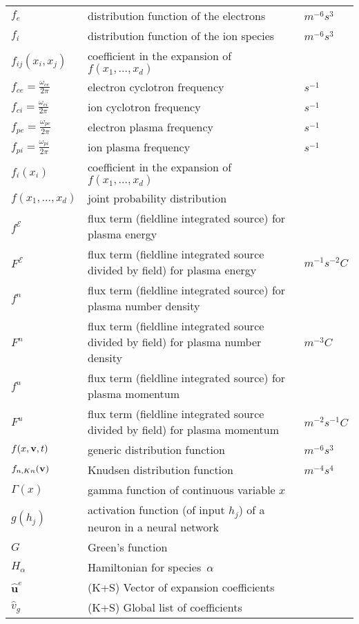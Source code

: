 \begin{longtable}{|p{3.0cm}|p{10.0cm}|p{3.0cm}|}
$f_e$ & distribution function of the electrons & $m^{-6} s^3$ \\
$f_i$ & distribution function of the ion species & $m^{-6} s^3$ \\
$f_{ij}(x_i,x_j)$ & coefficient in the expansion of $f\left(x_1,\ldots,x_d\right)$  & \\
$f_{ce}= \frac{\omega_{ce}}{2\pi}$ & electron cyclotron frequency & $s^{-1}$ \\
$f_{ci}= \frac{\omega_{ci}}{2\pi}$ & ion cyclotron frequency & $s^{-1}$ \\
$f_{pe}= \frac{\omega_{pe}}{2\pi}$ & electron plasma frequency & $s^{-1}$ \\
$f_{pi}= \frac{\omega_{pi}}{2\pi}$ & ion plasma frequency & $s^{-1}$ \\
$f_i(x_i)$ & coefficient in the expansion of $f\left(x_1,\ldots,x_d\right)$  & \\
$f\left(x_1,\ldots,x_d\right)$ & joint probability distribution  & \\
$f^\mathcal{E}$ & flux term (fieldline integrated source) for plasma energy  & \\
$F^\mathcal{E}$ & flux term (fieldline integrated source divided by field) for plasma energy  &  $m^{-1} s^{-2} C$ \\
$f^n$ & flux term (fieldline integrated source) for plasma number density & \\
$F^n$ & flux term (fieldline integrated source divided by field) for plasma number density  &  $m^{-3} C$ \\
$f^u$ & flux term (fieldline integrated source) for plasma momentum  & \\
$F^u$ & flux term (fieldline integrated source divided by field) for plasma momentum  &  $m^{-2} s^{-1} C$ \\
$f(x,{\bf v},t)$ & generic distribution function & $m^{-6} s^3$ \\
$f_{n,Kn}({\bf v})$ & Knudsen distribution function & $m^{-4} s^4$ \\
$\Gamma(x)$ & gamma function of continuous variable $x$  & \\
$g(h_j)$ & activation function (of input $h_j$) of a neuron in a neural network  & \\
$G$ & Green's function & \\
$H_\alpha$ & Hamiltonian for species~$\alpha$ & \\
$\hat{\boldsymbol{u}}^e$ &  (K+S) Vector of expansion coefficients & \\
$\hat{v}_g$ &  (K+S) Global list of coefficients & \\

\end{longtable}
